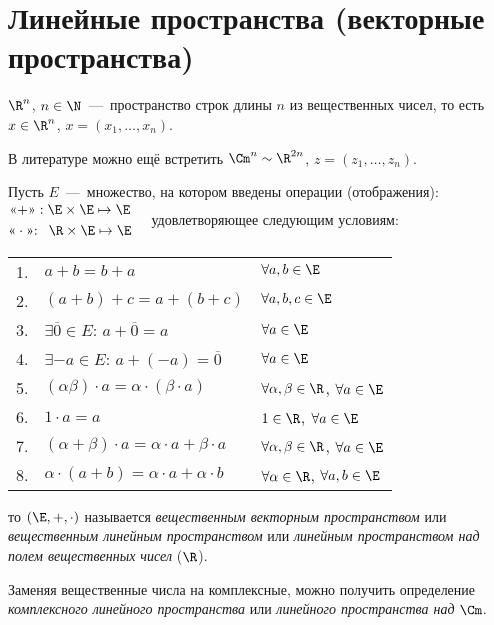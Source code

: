 \section{Линейные пространства (векторные пространства)}

\begin{definition}
    $\R^n$, $n \in \N$~---~пространство строк длины $n$ из вещественных чисел, то есть $x \in \R^n$, $x = (x_{1}, \ldots, x_{n})$.
\end{definition}
\begin{note}
    В литературе можно ещё встретить $\Cm^n \sim \R^{2n}$, $z = (z_{1}, \ldots, z_{n})$.
\end{note}
\begin{definition}
    Пусть $E$~---~множество, на котором введены операции (отображения):
    $\begin{gathered}
	\text{<<+>>}: \E \times \E \mapsto \E \\
	\text{<<}\cdot\text{>>: }\  \R \times \E \mapsto \E
    \end{gathered} \quad$
    удовлетворяющее следующим условиям:

    \begin{tabular}{lll}
    1. & $a + b = b + a$ & $\forall a, b \in \E$ \\
    2. & $(a + b) + c = a + (b + c)$ & $\forall a, b, c \in \E$ \\
    3. & $\exists \overline{0} \in E$: $a + \overline{0} = a$ & $\forall a \in \E$ \\
    4. & $\exists -a \in E$: $a + (-a) = \overline{0}$ & $\forall a \in \E$ \\
    5. & $(\alpha \beta) \cdot a = \alpha \cdot (\beta \cdot a)$ & $\forall \alpha, \beta \in \R$, $\forall a \in \E$ \\
    6. & $1 \cdot a = a$ & $1 \in \R$, $\forall a \in \E$ \\
    7. & $(\alpha + \beta) \cdot a = \alpha \cdot a + \beta \cdot a$ & $\forall \alpha, \beta \in \R$, $\forall a \in \E$ \\
    8. & $\alpha \cdot (a + b) = \alpha \cdot a + \alpha \cdot b$ & $\forall \alpha \in \R$, $\forall a, b \in \E$
    \end{tabular}

    то $(\E, +, \cdot)$ называется \textit{вещественным векторным пространством} или \textit{вещественным линейным пространством} или \textit{линейным пространством над полем вещественных чисел} ($\R$).
\end{definition}
\begin{note}
    Заменяя вещественные числа на комплексные, можно получить определение \textit{комплексного линейного пространства} или \textit{линейного пространства над} $\Cm$.
\end{note}
